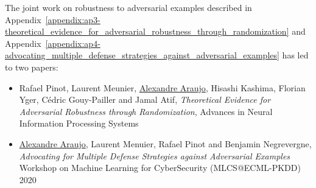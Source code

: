 \vspace{0.4cm}
\noindent
The joint work on robustness to adversarial examples described in Appendix~\ref{appendix:ap3-theoretical_evidence_for_adversarial_robustness_through_randomization} and Appendix~\ref{appendix:ap4-advocating_multiple_defense_strategies_against_adversarial_examples} has led to two papers:
\begin{itemize}[topsep=0pt,leftmargin=12pt]
  \setlength\itemsep{-0.3em}
  \item 
    Rafael Pinot, Laurent Meunier, \underline{Alexandre Araujo}, Hisashi Kashima, Florian Yger, Cédric Gouy-Pailler and Jamal Atif, 
    \emph{Theoretical Evidence for Adversarial Robustness through Randomization},
    Advances in Neural Information Processing Systems
  \item 
    \underline{Alexandre Araujo}, Laurent Menuier, Rafael Pinot and Benjamin Negrevergne,
    \emph{Advocating for Multiple Defense Strategies against Adversarial Examples}
    Workshop on Machine Learning for CyberSecurity (MLCS@ECML-PKDD) 2020
\end{itemize}



